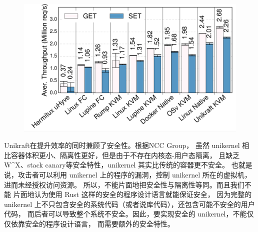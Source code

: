 \documentclass{../runikraft-report}
\begin{document}
\begin{figure}[H]
\begin{minipage}{0.32\linewidth}
\includegraphics[width=1\linewidth]{pictures/Unikraft-throughput.png}
\caption{}
\end{minipage}
\end{figure}

Unikraft在提升效率的同时兼顾了安全性。根据NCC Group\cite{bib:unikernel-secuirty}，
虽然 unikernel 相比容器体积更小、隔离性更好，但是由于不存在内核态-用户态隔离，
且缺乏W\^{}X、stack canary等安全特性，unikernel 其实比传统的容器更不安全。
也就是说，攻击者可以利用 unikernel 上的程序的漏洞，控制 unikernel 所在的虚拟机，
进而未经授权访问资源。
所以，不能片面地把安全性与隔离性等同。而且我们不能
片面地认为使用 Rust 这样的安全的程序设计语言就能保证安全，
因为完整的 unikernel 上不只包含安全的系统代码（或者说库代码），还包含可能不安全的用户代码，
而后者可以导致整个系统不安全。因此，要实现安全的 unikernel，不能仅仅依靠安全的程序设计语言，
而需要额外的安全特性。
\end{document}
